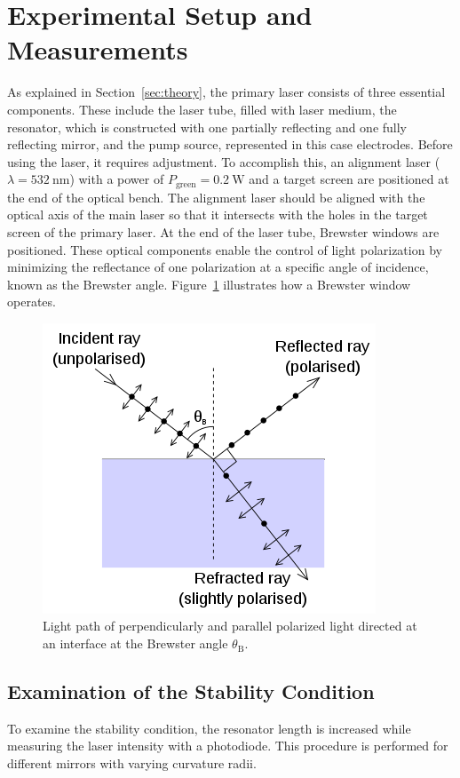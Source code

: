 \section{Experimental Setup and Measurements}
\label{sec:procedure}
As explained in Section~\ref{sec:theory}, the primary laser
consists of three essential components. These 
include the laser tube, filled with laser medium, the resonator, 
which is constructed with one partially reflecting and one
fully reflecting mirror, and the pump source, represented in this 
case electrodes. 
\noindent
Before using the laser, it requires adjustment. To accomplish this,
an alignment laser ($\lambda=\SI{532}{\nano\meter}$) with a power 
of $P_\text{green}=\SI{0.2}{\watt}$ and a target screen are positioned
at the end of the optical bench. The alignment laser should be aligned 
with the optical axis of the main laser so that it intersects with 
the holes in the target screen of the primary laser.  
\noindent
At the end of the laser tube, Brewster windows are positioned. 
These optical components enable the control of light polarization
by minimizing the reflectance of one polarization at a specific
angle of incidence, known as the Brewster angle. Figure~\ref{fig:brewster}
illustrates how a Brewster window operates.
\begin{figure}
    \centering
    \includegraphics[width=0.5\linewidth]{pictures/Brewster.png} %
    \caption{Light path of perpendicularly and parallel polarized light directed at an interface at the Brewster angle $\theta_\text{B}$.~\cite{Brewster}}
    \label{fig:brewster}
\end{figure}
\noindent
\subsection{Examination of the Stability Condition}
To examine the stability condition, the resonator length is increased
while measuring the laser intensity with a photodiode. This
procedure is performed for different mirrors with varying curvature 
radii.
